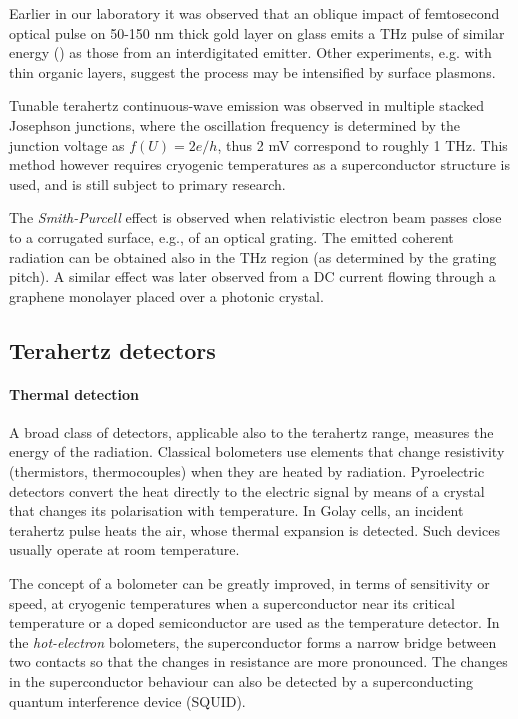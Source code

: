 Earlier in our laboratory it was observed that an oblique impact of femtosecond optical pulse on 50-150 nm thick gold layer on glass emits a THz pulse of similar energy (\cite{kadlec2004optical,kadlec2005study}) as those from an interdigitated emitter. Other experiments, e.g. with thin organic layers,\cite{ramakrishnan2012surface} suggest the process may be intensified by surface plasmons.

Tunable terahertz continuous-wave emission was observed in multiple stacked Josephson junctions\cite{welp2013superconducting}, where the oscillation frequency is determined by the junction voltage as $f(U) = 2e/h$, thus 2 mV correspond to roughly 1 THz. This method however requires cryogenic temperatures as a superconductor structure is used, and is still subject to primary research.

The \textit{Smith-Purcell} effect is observed when relativistic electron beam passes close to a corrugated surface, e.g., of an optical grating. The emitted coherent radiation can be obtained also in the THz region\cite{doucas1992first} (as determined by the grating pitch). A similar effect was later observed from a DC current flowing through a graphene monolayer placed over a photonic crystal.\cite{tantiwanichapan2014graphene}

\subsection{Terahertz detectors}
\paragraph{Thermal detection}%
A broad class of detectors, applicable also to the terahertz range, measures the energy of the radiation. 
Classical bolometers use elements that change resistivity (thermistors, thermocouples) when they are heated by radiation.
Pyroelectric detectors convert the heat directly to the electric signal by means of a crystal that changes its polarisation with temperature. In Golay cells, an incident terahertz pulse heats the air, whose thermal expansion is detected. Such devices usually operate at room temperature.

The concept of a bolometer can be greatly improved, in terms of sensitivity or speed, at cryogenic temperatures when a superconductor near its critical temperature or a doped semiconductor are used as the temperature detector. In the \textit{hot-electron} bolometers, the superconductor forms a narrow bridge between two contacts so that the changes in resistance are more pronounced. The changes in the superconductor behaviour can also be detected by a superconducting quantum interference device (SQUID).  


